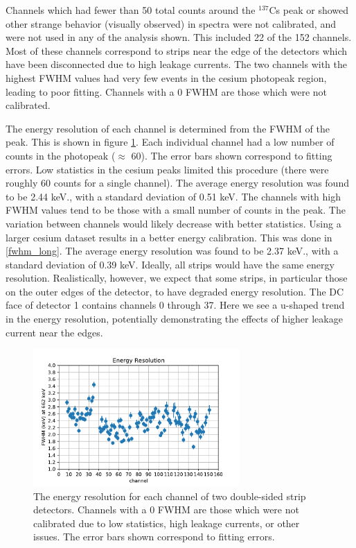 Channels which had fewer than 50 total counts around the ${}^{137}$Cs peak or showed other strange behavior (visually observed) in spectra were not calibrated, and were not used in any of the analysis shown. This included 22 of the 152 channels. Most of these channels correspond to strips near the edge of the detectors which have been disconnected due to high leakage currents. The two channels with the highest FWHM values had very few events in the cesium photopeak region, leading to poor fitting. Channels with a 0 FWHM are those which were not calibrated.

The energy resolution of each channel is determined from the FWHM of the peak. This is shown in figure \ref{fwhm}. Each individual channel had a low number of counts in the photopeak ($\approx$ 60). The error bars shown correspond to fitting errors. Low statistics in the cesium peaks limited this procedure (there were roughly 60 counts for a single channel). The average energy resolution was found to be 2.44 keV., with a standard deviation of 0.51 keV. The channels with high FWHM values tend to be those with a small number of counts in the peak. The variation between channels would likely decrease with better statistics.  Using a larger cesium dataset results in a better energy calibration. This was done in \ref{fwhm_long}. The average energy resolution was found to be 2.37 keV., with a standard deviation of 0.39 keV. Ideally, all strips would have the same energy resolution. Realistically, however, we expect that some strips, in particular those on the outer edges of the detector, to have degraded energy resolution. The DC face of detector 1 contains channels 0 through 37. Here we see a u-shaped trend in the energy resolution, potentially demonstrating the effects of higher leakage current near the edges.

\begin{figure}[h]
\begin{centering}
\includegraphics[width=0.7\textwidth]{./figures/energy_res.pdf}
\caption{The energy resolution for each channel of two double-sided strip detectors. Channels with a 0 FWHM are those which were not calibrated due to low statistics, high leakage currents, or other issues. The error bars shown correspond to fitting errors.}
\label{fwhm}
\end{centering}
\end{figure}

